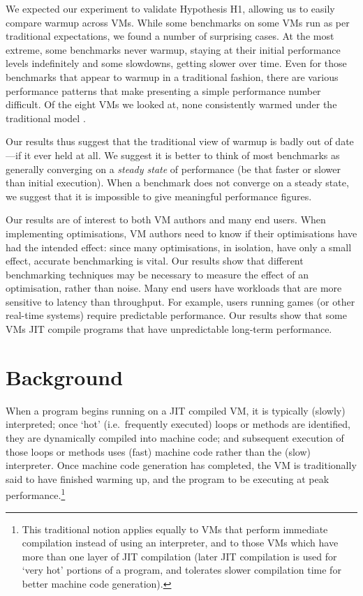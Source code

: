 \documentclass[a4paper,UKenglish]{lipics}
\begin{document}
We expected our experiment to validate Hypothesis H1, allowing us to
easily compare warmup across VMs. While some benchmarks on some VMs run as per
traditional expectations, we found a number of surprising cases. At
the most extreme, some benchmarks never warmup, staying at their initial performance
levels indefinitely and some slowdowns, getting slower over time. Even for
those benchmarks that appear to warmup in a traditional fashion, there are
various performance patterns that make presenting a simple performance number
difficult. Of the eight VMs we looked at,
none consistently warmed under the traditional model .

Our results thus suggest that the traditional view of warmup is badly out of
date---if it ever held at all. We suggest it is better to think of most benchmarks as
generally converging on a \emph{steady state} of performance (be that faster or
slower than initial execution). When a benchmark does not converge on a steady
state, we suggest that it is impossible to give meaningful performance figures.

Our results are of interest to both VM authors and many end users. When
implementing optimisations, VM authors need to know if their optimisations have
had the intended effect: since many optimisations, in isolation, have only a
small effect, accurate benchmarking is vital. Our results show that different
benchmarking techniques may be necessary to measure the effect of an
optimisation, rather than noise. Many end users have workloads that are more
sensitive to latency than throughput. For example, users running games (or other
real-time systems) require predictable performance. Our results show that some
VMs JIT compile programs that have unpredictable long-term performance.

%


\section{Background}
\label{sec:warmup}

When a program begins running on a JIT compiled VM, it is typically (slowly)
interpreted; once `hot' (i.e.~frequently executed) loops or methods are
identified, they are dynamically compiled into machine code; and subsequent
execution of those loops or methods uses (fast) machine code rather than the
(slow) interpreter. Once machine code generation has completed, the VM is
traditionally said to have finished warming up, and the program to be executing
at peak performance.\footnote{This traditional notion applies equally to VMs
that perform immediate compilation instead of using an interpreter, and to
those VMs which have more than one layer of JIT compilation (later JIT
compilation is used for `very hot' portions of a program, and tolerates slower
compilation time for better machine code generation).}
\end{document}
